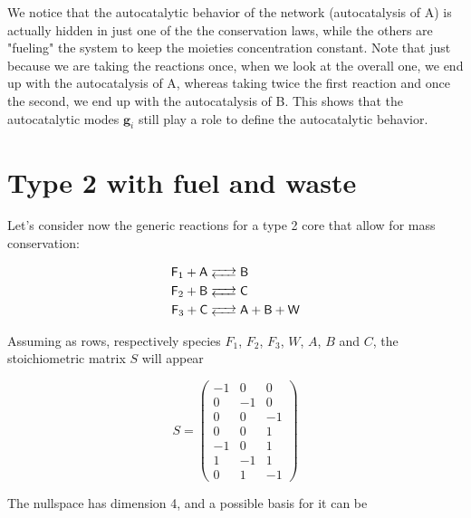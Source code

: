 \documentclass{article}
\begin{document}
 We notice that the autocatalytic behavior of the network (autocatalysis of A) is actually hidden in just one of the the conservation laws, while the others are "fueling" the system to keep the moieties concentration constant.
 Note that just because we are taking the reactions once, when we look at the overall one, we end up with the autocatalysis of A, whereas taking twice the first reaction and once the second, we end up with the autocatalysis of B. This shows that the autocatalytic modes $\mathbf{g}_i$ still play a role to define the autocatalytic behavior.

\section{Type 2 with fuel and waste}

Let's consider now the generic reactions for a type 2 core that allow for mass conservation:

\begin{equation}
\label{set_reactions_2}
		\begin{split}
		\ce{\textsf{F}_1 + \textsf{A} & <--> \textsf{B} } \\ 
\ce{\textsf{F}_2 + \textsf{B} & <--> \textsf{C}} \\
\ce{\textsf{F}_3 + \textsf{C} & <--> \textsf{A} + \textsf{B} + \textsf{W}}
		\end{split} 
\end{equation}

Assuming as rows, respectively species $F_1$, $F_2$, $F_3$, $W$, $A$, $B$ and $C$, the stoichiometric matrix $S$ will appear 

\begin{center}
    \begin{equation}
        S=\begin{pmatrix}
            -1 & 0 & 0 \\
            0 & -1 & 0 \\
            0 & 0 & -1 \\
            0 & 0 & 1 \\
            -1 & 0 & 1 \\
            1 & -1 & 1 \\
            0 & 1 & -1
\end{pmatrix}
\end{equation}
\end{center}

The nullspace has dimension 4, and a possible basis for it can be
\end{document}
